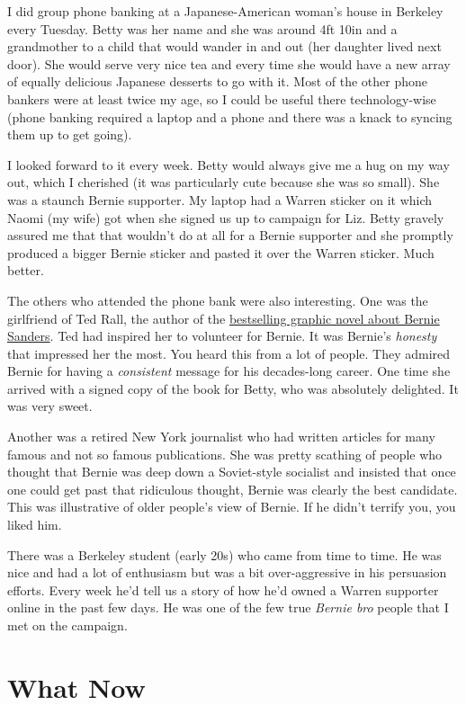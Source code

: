 \documentclass[]{book}
\begin{document}
I did group phone banking at a Japanese-American woman's house in Berkeley every Tuesday. Betty was her name and she was around 4ft 10in and a grandmother to a child that would wander in and out (her daughter lived next door). She would serve very nice tea and every time she would have a new array of equally delicious Japanese desserts to go with it. Most of the other phone bankers were at least twice my age, so I could be useful there technology-wise (phone banking required a laptop and a phone and there was a knack to syncing them up to get going).

I looked forward to it every week. Betty would always give me a hug on my way out, which I cherished (it was particularly cute because she was so small). She was a staunch Bernie supporter. My laptop had a Warren sticker on it which Naomi (my wife) got when she signed us up to campaign for Liz. Betty gravely assured me that that wouldn't do at all for a Bernie supporter and she promptly produced a bigger Bernie sticker and pasted it over the Warren sticker. Much better.

The others who attended the phone bank were also interesting. One was the girlfriend of Ted Rall, the author of the \href{https://www.penguinrandomhouse.com/books/536904/bernie-by-ted-rall/}{bestselling graphic novel about Bernie Sanders}. Ted had inspired her to volunteer for Bernie. It was Bernie's \emph{honesty} that impressed her the most. You heard this from a lot of people. They admired Bernie for having a \emph{consistent} message for his decades-long career. One time she arrived with a signed copy of the book for Betty, who was absolutely delighted. It was very sweet.

Another was a retired New York journalist who had written articles for many famous and not so famous publications. She was pretty scathing of people who thought that Bernie was deep down a Soviet-style socialist and insisted that once one could get past that ridiculous thought, Bernie was clearly the best candidate. This was illustrative of older people's view of Bernie. If he didn't terrify you, you liked him.

There was a Berkeley student (early 20s) who came from time to time. He was nice and had a lot of enthusiasm but was a bit over-aggressive in his persuasion efforts. Every week he'd tell us a story of how he'd owned a Warren supporter online in the past few days. He was one of the few true \emph{Bernie bro} people that I met on the campaign.

\hypertarget{what-now}{%
\chapter{What Now}\label{what-now}}
\end{document}

